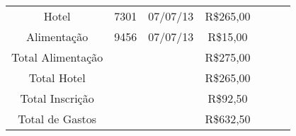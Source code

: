 \documentclass{article}
\begin{document}
\begin{table}[htbp!]
\begin{tabular}{|c|c|c|c|c|c|}
    Hotel                 & 7301   & 07/07/13 & R\$265,00            & ~                                & ~                   \\
    Alimentação           & 9456   & 07/07/13 & R\$15,00             & ~                                & ~                   \\
\hline
    Total Alimentação     & ~      & ~        & R\$275,00            & ~                                & ~                   \\
    Total Hotel           & ~      & ~        & R\$265,00            & ~                                & ~                   \\
    Total Inscrição       & ~      & ~        & R\$92,50             & ~                                & ~                   \\
\hline
    Total de Gastos       & ~      & ~        & R\$632,50            & ~                                & ~                   \\
\hline

    \end{tabular}
\end{table}

%
%
\end{document}
